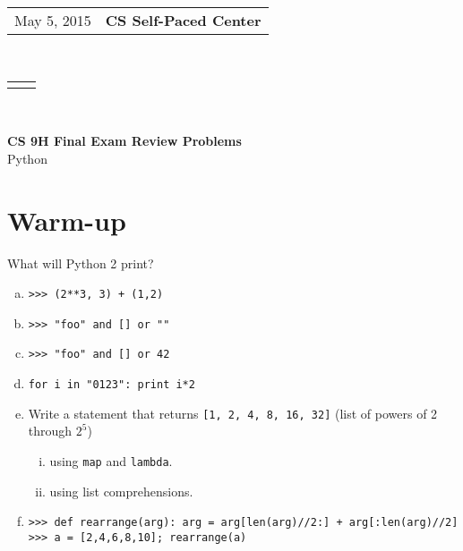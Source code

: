 \documentclass[11pt]{article}
\renewcommand{\title}[1]{\large\textbf{#1}\\}
\renewcommand{\line}{\begin{tabularx}{\textwidth}{X>{\raggedleft}X}\hline\\\end{tabularx}\\[-0.5cm]}
\newcommand{\leftright}[2]{\begin{tabularx}{\textwidth}{X>{\raggedleft}X}#1%
& #2\\\end{tabularx}\\[-0.5cm]}
\begin{document}
\leftright{May 5, 2015}{\textbf{CS Self-Paced Center}} %
\line

\begin{center}
    \Large\textbf{CS 9H Final Exam Review Problems}\\
    \large{Python}
 \end{center}



\section{Warm-up}
What will Python 2 print?
\begin{enumerate}[a)]
\item \texttt{>>> (2**3, 3) + (1,2)}
\vspace{1cm}

\item \texttt{>>> "foo" and [] or ""}
\vspace{1cm}

\item \texttt{>>> "foo" and [] or 42}
\vspace{1cm}

\item \texttt{for i in "0123": print i*2}
\vspace{1cm}

\item Write a statement that returns \texttt{[1, 2, 4, 8, 16, 32]} (list of powers of 2 through $2^{5}$)
    \begin{enumerate}[i)]
    \item using \texttt{map} and \texttt{lambda}.
    \vspace{1cm}
    \item using list comprehensions.
    \vspace{1cm}
    \end{enumerate}
    
\item \begin{verbatim}
>>> def rearrange(arg): arg = arg[len(arg)//2:] + arg[:len(arg)//2]
>>> a = [2,4,6,8,10]; rearrange(a)
\end{verbatim}
\vspace{1cm}


\end{enumerate}

\end{document}
